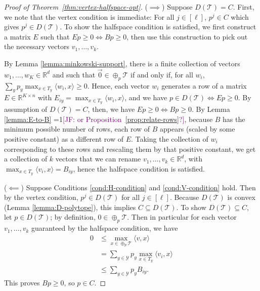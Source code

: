 \documentclass[final]{colt2020} %
\newcommand{\Comments}{1}
\newcommand{\mynote}[2]{\ifnum\Comments=1\textcolor{#1}{#2}\fi}
\newcommand{\jessie}[1]{\mynote{purple}{[JF: #1]}}
\newcommand{\reals}{\mathbb{R}}
\newcommand{\T}{\mathcal{T}}
\newcommand{\Y}{\mathcal{Y}}
\newcommand{\inprod}[2]{\langle #1, #2 \rangle}%
\begin{document}
\begin{proof}[Proof of Theorem~\ref{thm:vertex-halfspace-opt}]
	($\implies$)
	Suppose $D(\T) = C$.
	First, we note that the vertex condition is immediate: For all $j \in [\ell]$, $p^j \in C$ which gives $p^j \in D(\T)$.
	To show the halfspace condition is satisfied, we first construct a matrix $E$ such that $Ep \geq 0 \iff Bp \geq 0$, then use this construction to pick out the necessary vectors $v_1,\dots,v_k$.
	
	By Lemma \ref{lemma:minkowski-support}, there is a finite collection of vectors $w_1,\dots,w_{K} \in \reals^d$ and such that $\vec 0 \in \oplus_p \T$ if and only if, for all $w_i$, $\sum_y p_y \max_{x \in T_y} \inprod{w_i}{x} \geq 0$.
	Hence, each vector $w_i$ generates a row of a matrix $E \in \reals^{K \times n}$ with $E_{iy} = \max_{x \in T_y} \inprod{w_i}{x}$, and we have $p \in D(\T) \iff Ep \geq 0$.
	By assumption of $D(\T) = C$, then, we have $Ep \geq 0 \iff Bp \geq 0$.
	By Lemma \ref{lemma:E-to-B} \jessie{or Proposition~\ref{prop:relate-rows}?}, because $B$ has the minimum possible number of rows, each row of $B$ appears (scaled by some positive constant) as a different row of $E$. Taking the collection of $w_i$ corresponding to these rows and rescaling them by that positive constant, we get a collection of $k$ vectors that we can rename $v_1,\ldots,v_k \in \reals^d$, with $\max_{x \in T_y} \inprod{v_i}{x} = B_{iy}$, hence the halfspace condition is satisfied.
	
	($\impliedby$)
	Suppose Conditions \ref{cond:H-condition} and \ref{cond:V-condition} hold.
	Then by the vertex condition, $p^j \in D(\T)$ for all $j \in [\ell]$.
	Because $D(\T)$ is convex (Lemma \ref{lemma:D-polytope}), this implies $C \subseteq D(\T)$.
	To show $D(\T) \subseteq C$, let $p \in D(\T)$; by definition, $0 \in \oplus_p \T$.
	Then in particular for each vector $v_1,\ldots,v_k$ guaranteed by the halfspace condition, we have
	\begin{align*}
	0 &\leq \max_{x \in \oplus_p \T} \inprod{v}{x}  \\
	&=    \sum_{y \in \Y} p_y \max_{x \in T_y} \inprod{v_i}{x}  \\
	&\leq \sum_{y \in \Y} p_y B_{iy} .
	\end{align*}
	This proves $Bp \geq 0$, so $p \in C$.
\end{proof}
\end{document}
